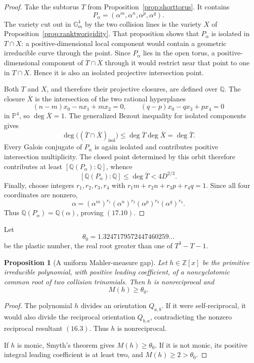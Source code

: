 \documentclass[11pt]{article}
\newtheorem{proposition}[theorem]{Proposition}
\theoremstyle{definition}
\newcommand{\Q}{\mathbb Q}
\newcommand{\Z}{\mathbb Z}
\begin{document}
\begin{proof}
Take the subtorus \(T\) from Proposition~\ref{prop:shorttorus}.  It contains
\[
 P_\alpha=(\alpha^m,\alpha^n,\alpha^p,\alpha^q).
\]
The variety cut out in \(\mathbb G_m^4\) by the two collision lines is the
variety \(X\) of Proposition~\ref{prop:ranktworigidity}.  That proposition
shows that \(P_\alpha\) is isolated in \(T\cap X\): a positive-dimensional
local component would contain a geometric irreducible curve through the
point.  Since \(P_\alpha\) lies in the open torus, a positive-dimensional
component of \(\overline T\cap\overline X\) through it would restrict near
that point to one in \(T\cap X\).  Hence it is also an isolated projective
intersection point.

Both \(T\) and \(X\), and therefore their projective closures, are defined
over \(\Q\).  The closure \(\overline X\) is the intersection of the two
rational hyperplanes
\[
 (n-m)x_0-nx_1+mx_2=0,
 \qquad
 (q-p)x_0-qx_3+px_4=0
\]
in \(\mathbb P^4\), so \(\deg\overline X=1\).  The generalized Bezout
inequality for isolated components
\cite[\S8.4]{Fulton1998} gives
\[
 \deg\bigl((\overline T\cap\overline X)_{\mathrm{isol}}\bigr)
 \leq\deg\overline T\deg\overline X=\deg\overline T.
\]
Every Galois conjugate of \(P_\alpha\) is again isolated and contributes
positive intersection multiplicity.  The closed point determined by this
orbit therefore contributes at least \([\Q(P_\alpha):\Q]\), whence
\[
 [\Q(P_\alpha):\Q]\leq\deg\overline T<4D^{2/3}.
\]
Finally, choose integers \(r_1,r_2,r_3,r_4\) with
\(r_1m+r_2n+r_3p+r_4q=1\).  Since all four coordinates are nonzero,
\[
 \alpha=(\alpha^m)^{r_1}(\alpha^n)^{r_2}
         (\alpha^p)^{r_3}(\alpha^q)^{r_4}.
\]
Thus \(\Q(P_\alpha)=\Q(\alpha)\), proving \((17.10)\).
\end{proof}

Let
\[
 \theta_0=1.3247179572447460259\ldots
\]
be the plastic number, the real root greater than one of
\(T^3-T-1\).

\begin{proposition}[A uniform Mahler-measure gap]\label{prop:mahlergap}
Let \(h\in\Z[x]\) be the primitive irreducible polynomial, with positive
leading coefficient, of a noncyclotomic common root of two collision
trinomials.  Then \(h\) is nonreciprocal and
\begin{equation}
 M(h)\geq\theta_0.
 \tag{17.11}
\end{equation}
\end{proposition}

\begin{proof}
The polynomial \(h\) divides an orientation \(Q_{a,b}\).  If it were
self-reciprocal, it would also divide the reciprocal orientation
\(Q_{b,a}\), contradicting the nonzero reciprocal resultant \((16.3)\).
Thus \(h\) is nonreciprocal.

If \(h\) is monic, Smyth's theorem \cite{Smyth1971} gives
\(M(h)\geq\theta_0\).  If it is not monic, its positive integral leading
coefficient is at least two, and
\(M(h)\geq2>\theta_0\).
\end{proof}
\end{document}
